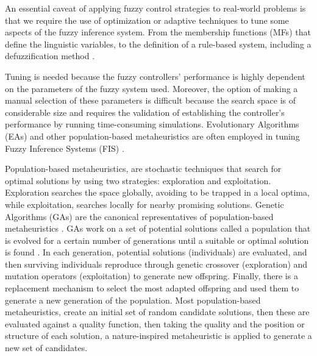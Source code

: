 \documentclass[symmetry,article,submit,moreauthors,pdftex]{Definitions/mdpi}
\begin{document}
An essential caveat of applying fuzzy control strategies to real-world problems
is that we require the use of optimization or adaptive techniques to tune some
aspects of the fuzzy inference system.  From the membership functions (MFs)
that define the linguistic variables, to the definition of a rule-based
system, including a defuzzification method
\cite{xia2019command,isaka1988design}. 

Tuning is needed because the fuzzy controllers' performance is highly dependent
on the parameters of the fuzzy system used. Moreover, the option of making a
manual selection of these parameters is difficult because the search space is
of considerable size and requires the validation of establishing the
controller's performance by running time-consuming simulations.  Evolutionary
Algorithms (EAs) and other population-based metaheuristics are often employed in tuning 
Fuzzy Inference Systems (FIS) %
\cite{martinez-soto_bio-inspired_2012,DBLP:conf/evoW/SalemMGG18}.

Population-based metaheuristics, are stochastic techniques that search for
optimal solutions by using two strategies: exploration and exploitation.
Exploration searches the space globally, avoiding to be trapped in a local
optima, while exploitation, searches locally for nearby promising solutions.
Genetic Algorithms (GAs) are the canonical representatives of population-based
metaheuristics \cite{holland1992genetic}.  GAs work on a set of potential
solutions called a population that is evolved for a certain number of
generations until a suitable or optimal solution is found
\cite{muelas_algoritmos_2009}.  In each generation, potential solutions
(individuals) are evaluated, and then surviving individuals reproduce through
genetic crossover (exploration) and mutation operators (exploitation) to
generate new offspring.  Finally, there is a replacement mechanism to select
the most adapted offspring and used them to generate a new generation of the
population.  Most population-based metaheuristics, create an initial set of
random candidate solutions, then these are evaluated against a quality
function, then taking the quality and the position or structure of each
solution, a nature-inspired metaheuristic is applied to generate a new set of
candidates. 
\end{document}

